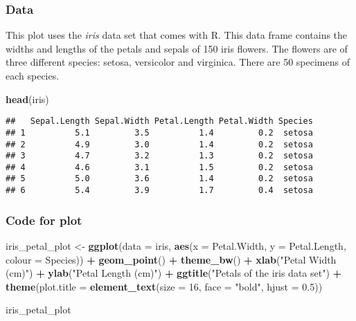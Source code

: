 \documentclass[]{book}
\newenvironment{Shaded}{\begin{snugshade}}{\end{snugshade}}
\newcommand{\DataTypeTok}[1]{\textcolor[rgb]{0.13,0.29,0.53}{#1}}
\newcommand{\DecValTok}[1]{\textcolor[rgb]{0.00,0.00,0.81}{#1}}
\newcommand{\FloatTok}[1]{\textcolor[rgb]{0.00,0.00,0.81}{#1}}
\newcommand{\KeywordTok}[1]{\textcolor[rgb]{0.13,0.29,0.53}{\textbf{#1}}}
\newcommand{\NormalTok}[1]{#1}
\newcommand{\OperatorTok}[1]{\textcolor[rgb]{0.81,0.36,0.00}{\textbf{#1}}}
\newcommand{\StringTok}[1]{\textcolor[rgb]{0.31,0.60,0.02}{#1}}
\begin{document}
\hypertarget{irisdata}{%
\subsubsection*{Data}\label{irisdata}}

This plot uses the \emph{iris} data set that comes with R. This data frame contains the widths and lengths of the petals and sepals of 150 iris flowers.
The flowers are of three different species: setosa, versicolor and virginica. There are 50 specimens of each species.

\begin{Shaded}
\begin{Highlighting}[]
\KeywordTok{head}\NormalTok{(iris)}
\end{Highlighting}
\end{Shaded}

\begin{verbatim}
##   Sepal.Length Sepal.Width Petal.Length Petal.Width Species
## 1          5.1         3.5          1.4         0.2  setosa
## 2          4.9         3.0          1.4         0.2  setosa
## 3          4.7         3.2          1.3         0.2  setosa
## 4          4.6         3.1          1.5         0.2  setosa
## 5          5.0         3.6          1.4         0.2  setosa
## 6          5.4         3.9          1.7         0.4  setosa
\end{verbatim}

\hypertarget{iriscode}{%
\subsubsection*{Code for plot}\label{iriscode}}

\begin{Shaded}
\begin{Highlighting}[]
\NormalTok{iris_petal_plot <-}\StringTok{ }\KeywordTok{ggplot}\NormalTok{(}\DataTypeTok{data =}\NormalTok{ iris, }\KeywordTok{aes}\NormalTok{(}\DataTypeTok{x =}\NormalTok{ Petal.Width, }\DataTypeTok{y =}\NormalTok{ Petal.Length, }\DataTypeTok{colour =}\NormalTok{ Species)) }\OperatorTok{+}\StringTok{ }
\StringTok{  }\KeywordTok{geom_point}\NormalTok{() }\OperatorTok{+}\StringTok{ }\KeywordTok{theme_bw}\NormalTok{() }\OperatorTok{+}
\StringTok{  }\KeywordTok{xlab}\NormalTok{(}\StringTok{"Petal Width (cm)"}\NormalTok{) }\OperatorTok{+}\StringTok{ }
\StringTok{  }\KeywordTok{ylab}\NormalTok{(}\StringTok{"Petal Length (cm)"}\NormalTok{) }\OperatorTok{+}\StringTok{ }
\StringTok{  }\KeywordTok{ggtitle}\NormalTok{(}\StringTok{"Petals of the iris data set"}\NormalTok{) }\OperatorTok{+}\StringTok{ }
\StringTok{  }\KeywordTok{theme}\NormalTok{(}\DataTypeTok{plot.title =} \KeywordTok{element_text}\NormalTok{(}\DataTypeTok{size =} \DecValTok{16}\NormalTok{, }\DataTypeTok{face =} \StringTok{"bold"}\NormalTok{, }\DataTypeTok{hjust =} \FloatTok{0.5}\NormalTok{))}

\NormalTok{iris_petal_plot}
\end{Highlighting}
\end{Shaded}
\end{document}
